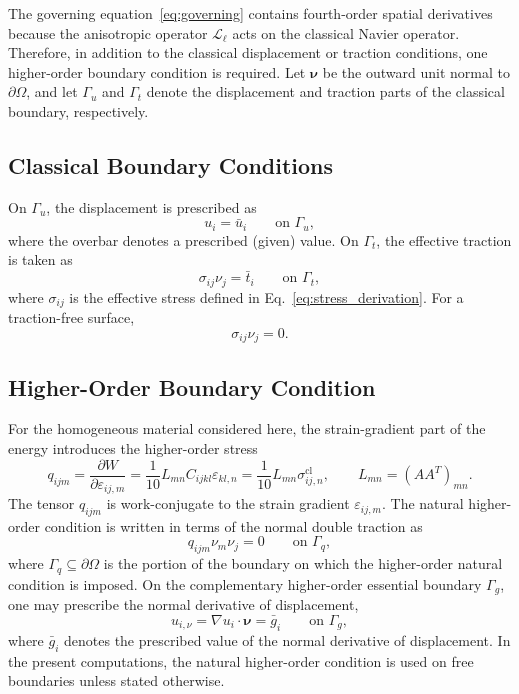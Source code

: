 \documentclass[final,3p,times,fleqn]{elsarticle}
\begin{document}
The governing equation~\eqref{eq:governing} contains fourth-order
spatial derivatives because the anisotropic operator
$\mathcal{L}_{\ell}$ acts on the classical Navier operator. Therefore,
in addition to the classical displacement or traction conditions, one
higher-order boundary condition is required. Let $\boldsymbol{\nu}$ be
the outward unit normal to $\partial\Omega$, and let
$\Gamma_u$ and $\Gamma_t$ denote the displacement and traction parts of
the classical boundary, respectively.

\subsection{Classical Boundary Conditions}

On $\Gamma_u$, the displacement is prescribed as
\begin{equation}\label{eq:essential_BC}
u_i=\bar{u}_i
\qquad
\text{on } \Gamma_u ,
\end{equation}
where the overbar denotes a prescribed (given) value.
On $\Gamma_t$, the effective traction is taken as
\begin{equation}\label{eq:traction_BC}
\sigma_{ij}\nu_j=\bar{t}_i
\qquad
\text{on } \Gamma_t ,
\end{equation}
where $\sigma_{ij}$ is the effective stress defined in
Eq.~\eqref{eq:stress_derivation}. For a traction-free surface,
\begin{equation}\label{eq:free_traction}
\sigma_{ij}\nu_j=0 .
\end{equation}

\subsection{Higher-Order Boundary Condition}

For the homogeneous material considered here, the strain-gradient part of
the energy introduces the higher-order stress
\begin{equation}\label{eq:higher_order_stress}
q_{ijm}
=
\frac{\partial W}{\partial \varepsilon_{ij,m}}
=
\frac{1}{10}
L_{mn}C_{ijkl}\varepsilon_{kl,n}
=
\frac{1}{10}
L_{mn}\sigma_{ij,n}^{\mathrm{cl}},
\qquad
L_{mn}=(AA^T)_{mn}.
\end{equation}
The tensor $q_{ijm}$ is work-conjugate to the strain gradient
$\varepsilon_{ij,m}$. The natural higher-order condition is written in
terms of the normal double traction as
\begin{equation}\label{eq:double_traction_BC}
q_{ijm}\nu_m\nu_j=0
\qquad
\text{on } \Gamma_q ,
\end{equation}
where $\Gamma_q\subseteq\partial\Omega$ is the portion of the boundary
on which the higher-order natural condition is imposed. On the
complementary higher-order essential boundary $\Gamma_g$, one may
prescribe the normal derivative of displacement,
\begin{equation}\label{eq:higher_order_essential_BC}
u_{i,\nu}
=
\nabla u_i\cdot\boldsymbol{\nu}
=
\bar{g}_i
\qquad
\text{on } \Gamma_g ,
\end{equation}
where $\bar{g}_i$ denotes the prescribed value of the normal derivative of displacement.
In the present computations, the natural higher-order condition is used
on free boundaries unless stated otherwise.
\end{document}
